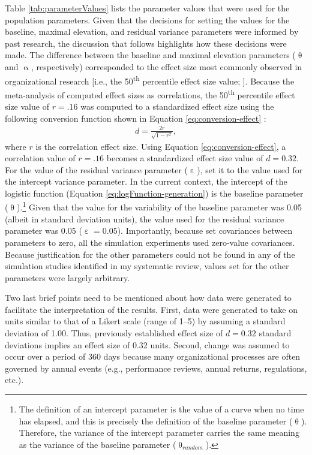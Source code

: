 \documentclass[
12pt, %
twoside,
english]{guelphthesis}
\begin{document}
Table \ref{tab:parameterValues} lists the parameter values that were used for the population parameters. Given that the decisions for setting the values for the baseline, maximal elevation, and residual variance parameters were informed by past research, the discussion that follows highlights how these decisions were made. The difference between the baseline and maximal elevation parameters (\(\uptheta\) and \(\upalpha\), respectively) corresponded to the effect size most commonly observed in organizational research {[}i.e., the 50\textsuperscript{th} percentile effect size value; \textcite{bosco2015}{]}. Because the meta-analysis of \textcite{bosco2015} computed effect sizes as correlations, the 50\textsuperscript{th} percentile effect size value of \(r = .16\) was computed to a standardized effect size using the following conversion function shown in Equation \ref{eq:conversion-effect} \autocite[Chapter 7]{borenstein2009}:
\begin{align}
d = \frac{2r}{\sqrt{1 - r^2}}, 
\label{eq:conversion-effect}
\end{align}
\noindent where \(r\) is the correlation effect size. Using Equation \ref{eq:conversion-effect}, a correlation value of \(r = .16\) becomes a standardized effect size value of \(d = 0.32\). For the value of the residual variance parameter (\(\upepsilon\)), \textcite{coulombe2016} set it to the value used for the intercept variance parameter. In the current context, the intercept of the logistic function (Equation \ref{eq:logFunction-generation}) is the baseline parameter (\(\uptheta\)).\footnote{The definition of an intercept parameter is the value of a curve when no time has elapsed, and this is precisely the definition of the baseline parameter ($\uptheta$). Therefore, the variance of the intercept parameter carries the same meaning as the variance of the baseline parameter ($\uptheta_{random}$).} Given that the value for the variability of the baseline parameter was 0.05 (albeit in standard deviation units), the value used for the residual variance parameter was 0.05 (\(\upepsilon = 0.05\)). Importantly, because \textcite{coulombe2016} set covariances between parameters to zero, all the simulation experiments used zero-value covariances. Because justification for the other parameters could not be found in any of the simulation studies identified in my systematic review, values set for the other parameters were largely arbitrary.

Two last brief points need to be mentioned about how data were generated to facilitate the interpretation of the results. First, data were generated to take on units similar to that of a Likert scale (range of 1--5) by assuming a standard deviation of 1.00. Thus, previously established effect size of \(d = 0.32\) standard deviations implies an effect size of 0.32 units. Second, change was assumed to occur over a period of 360 days because many organizational processes are often governed by annual events (e.g., performance reviews, annual returns, regulations, etc.).
\end{document}

